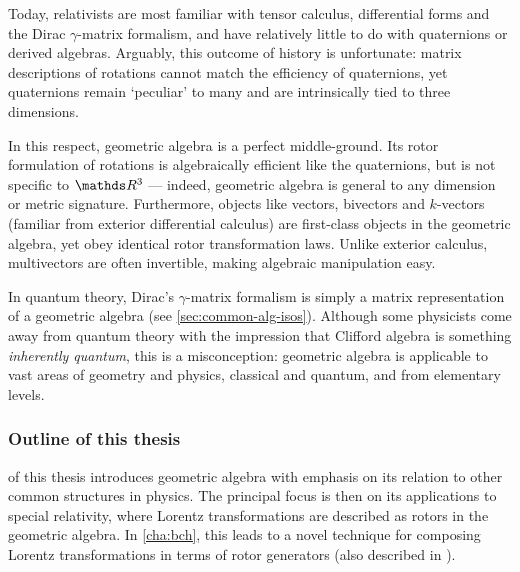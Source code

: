 Today, relativists are most familiar with tensor calculus, differential forms and the Dirac $γ$-matrix formalism, and have relatively little to do with quaternions or derived algebras.
Arguably, this outcome of history is unfortunate: matrix descriptions of rotations cannot match the efficiency of quaternions, yet quaternions remain `peculiar' to many and are intrinsically tied to three dimensions.

In this respect, geometric algebra is a perfect middle-ground.
Its rotor formulation of rotations is algebraically efficient like the quaternions, but is not specific to $\RR^3$ --- indeed, geometric algebra is general to any dimension or metric signature.
Furthermore, objects like vectors, bivectors and $k$-vectors (familiar from exterior differential calculus) are first-class objects in the geometric algebra, yet obey identical rotor transformation laws.
Unlike exterior calculus, multivectors are often invertible, making algebraic manipulation easy.

In quantum theory, Dirac's $γ$-matrix formalism is simply a matrix representation of a geometric algebra (see \cref{sec:common-alg-isos}).
Although some physicists come away from quantum theory with the impression that Clifford algebra is something \emph{inherently quantum}, this is a misconception: geometric algebra is applicable to vast areas of geometry and physics, classical and quantum, and from elementary levels.


\subsubsection{Outline of this thesis}


 of this thesis introduces geometric algebra with emphasis on its relation to other common structures in physics.
The principal focus is then on its applications to special relativity, where Lorentz transformations are described as rotors in the geometric algebra.
In \cref{cha:bch}, this leads to a novel technique for composing Lorentz transformations in terms of rotor generators (also described in \cite{wilson2021ga-bch}).

